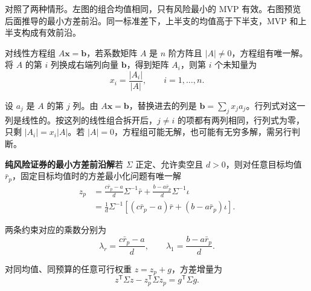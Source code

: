  对照了两种情形。左图的组合均值相同，只有风险最小的 MVP 有效。右图预览后面推导的最小方差前沿。同一标准差下，上半支的均值高于下半支，MVP 和上半支构成有效前沿。

\begin{center}
\begin{minipage}{\linewidth}
\centering
\renewcommand{\thewjFigure}{\thechapter.S\arabic{wjFigure}}%
%
\par
{}
\end{minipage}
\end{center}

\begin{tcolorbox}[knowledge,title=克莱默法则（Cramer's rule）]
对线性方程组 $A\mathbf{x}=\mathbf{b}$，若系数矩阵 $A$ 是 $n$ 阶方阵且 $\lvert A\rvert\ne0$，方程组有唯一解。将 $A$ 的第 $i$ 列换成右端列向量 $\mathbf{b}$，得到矩阵 $A_i$，则第 $i$ 个未知量为
\[
 x_i=\frac{\lvert A_i\rvert}{\lvert A\rvert},\qquad i=1,\ldots,n.
\]

设 $a_j$ 是 $A$ 的第 $j$ 列。由 $A\mathbf{x}=\mathbf{b}$，替换进去的列是 $\mathbf{b}=\sum_j x_j a_j$。行列式对这一列是线性的。按这列的线性组合拆开后，$j\ne i$ 的项都有两列相同，行列式为零，只剩 $\lvert A_i\rvert=x_i\lvert A\rvert$。若 $\lvert A\rvert=0$，方程组可能无解，也可能有无穷多解，需另行判断。
\end{tcolorbox}

\begin{tcolorbox}[knowledge]
\textbf{纯风险证券的最小方差前沿解}\quad 若 $\Sigma$ 正定、允许卖空且 $d>0$，则对任意目标均值 $\bar r_p$，固定目标均值时的方差最小化问题有唯一解
\begin{equation}
 \begin{aligned}
 z_p
 &=\frac{c\bar r_p-a}{d}\Sigma^{-1}\bar r
   +\frac{b-a\bar r_p}{d}\Sigma^{-1}\iota\\
 &=\frac1d\Sigma^{-1}
   [(c\bar r_p-a)\bar r+(b-a\bar r_p)\iota].
 \end{aligned}
 \label{eq:wj-12-3}
\end{equation}

两条约束对应的乘数分别为
\[
 \lambda_r=\frac{c\bar r_p-a}{d},\qquad \lambda_1=\frac{b-a\bar r_p}{d}.
\]

对同均值、同预算的任意可行权重 $z=z_p+g$，方差增量为
\begin{equation*}
 z^{\mathsf T}\Sigma z-z_p^{\mathsf T}\Sigma z_p
 =g^{\mathsf T}\Sigma g.
 \tag{12.V}\label{eq:wj-12-variance-gap}
\end{equation*}
\end{tcolorbox}


